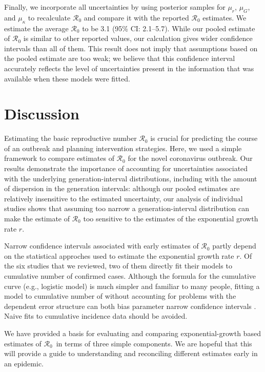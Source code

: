 \documentclass[12pt]{article}
\newcommand{\Rx}[1]{\ensuremath{{\mathcal R}_{#1}}}
\newcommand{\Ro}{\Rx{0}}
\begin{document}
Finally, we incorporate all uncertainties by using posterior samples for $\mu_r$, $\mu_G$, and $\mu_\kappa$ to recalculate $\mathcal R_0$ and compare it with the reported $\mathcal R_0$ estimates.
We estimate the average $\mathcal R_0$ to be 3.1 (95\% CI: 2.1--5.7).
While our pooled estimate of $\mathcal R_0$ is similar to other reported values, our calculation gives wider confidence intervals than all of them.
This result does not imply that assumptions based on the pooled estimate are too weak;
we believe that this confidence interval accurately reflects the level of uncertainties present in the information that was available when these models were fitted.

\section{Discussion}

Estimating the basic reproductive number $\mathcal R_0$ is crucial for predicting the course of an outbreak and planning intervention strategies.
Here, we used a simple framework \citep{park2019practical} to compare estimates of $\mathcal R_0$ for the novel coronavirus outbreak.
Our results demonstrate the importance of accounting for uncertainties associated with the underlying generation-interval distributions, including with the amount of dispersion in the generation intervals:
although our pooled estimates are relatively insensitive to the estimated uncertainty, our analysis of individual studies shows that assuming too narrow a generation-interval distribution can make the estimate of $\mathcal R_0$ too sensitive to the estimates of the exponential growth rate $r$.

Narrow confidence intervals associated with early estimates of $\mathcal R_0$ partly depend on the statistical approches used to estimate the exponential growth rate $r$.
Of the six studies that we reviewed, two of them directly fit their models to cumulative number of confirmed cases.
Although the formula for the cumulative curve (e.g., logistic model) is much simpler and familiar to many people, fitting a model to cumulative number of without accounting for problems with the dependent error structure can both bias parameter narrow confidence intervals \citep{ma2014estimating, king2015avoidable}.
Naive fits to cumulative incidence data should be avoided.

We have provided a basis for evaluating and comparing exponential-growth based estimates of \Ro\ in terms of three simple components. We are hopeful that this will provide a guide to understanding and reconciling different estimates early in an epidemic.
\end{document}
